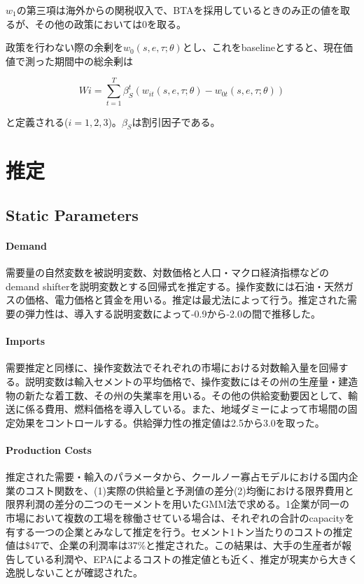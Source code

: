 \documentclass[11pt]{jsarticle}
\begin{document}
$w_1$の第三項は海外からの関税収入で、BTAを採用しているときのみ正の値を取るが、その他の政策においては0を取る。

政策を行わない際の余剰を$w_0(s, e, \tau; \theta)$とし、これをbaselineとすると、現在価値で測った期間中の総余剰は

\[
Wi = \sum_{t=1}^T \beta^t_S (w_{it}(s, e, \tau; \theta) - w_{0t}(s, e, \tau; \theta))
\]

と定義される($i = 1, 2, 3$)。$\beta_S$は割引因子である。

\section{推定}

\subsection{Static Parameters}

\paragraph{Demand}

需要量の自然変数を被説明変数、対数価格と人口・マクロ経済指標などのdemand shifterを説明変数とする回帰式を推定する。操作変数には石油・天然ガスの価格、電力価格と賃金を用いる。推定は最尤法によって行う。推定された需要の弾力性は、導入する説明変数によって-0.9から-2.0の間で推移した。

\paragraph{Imports}

需要推定と同様に、操作変数法でそれぞれの市場における対数輸入量を回帰する。説明変数は輸入セメントの平均価格で、操作変数にはその州の生産量・建造物の新たな着工数、その州の失業率を用いる。その他の供給変動要因として、輸送に係る費用、燃料価格を導入している。また、地域ダミーによって市場間の固定効果をコントロールする。供給弾力性の推定値は2.5から3.0を取った。

\paragraph{Production Costs}

推定された需要・輸入のパラメータから、クールノー寡占モデルにおける国内企業のコスト関数を、(1)実際の供給量と予測値の差分(2)均衡における限界費用と限界利潤の差分の二つのモーメントを用いたGMM法で求める。1企業が同一の市場において複数の工場を稼働させている場合は、それぞれの合計のcapacityを有する一つの企業とみなして推定を行う。セメント1トン当たりのコストの推定値は\$47で、企業の利潤率は37\%と推定された。この結果は、大手の生産者が報告している利潤や、EPAによるコストの推定値とも近く、推定が現実から大きく逸脱しないことが確認された。
\end{document}
